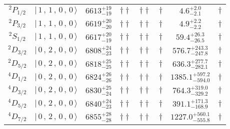 \begin{tabular}{c| c c c c c c c}
$^{2}P_{1/2}$ & $\vert \,1\,,\,1\,,\,0\,,\,0 \,\rangle $ & $6613^{+19}_{-19}$ & $\dagger\dagger$ & $\dagger\dagger$ & $\dagger$ & $4.6^{+2.0}_{-2.1}$ & $\dagger$ \\ 
$^{2}P_{3/2}$ & $\vert \,1\,,\,1\,,\,0\,,\,0 \,\rangle $ & $6619^{+20}_{-20}$ & $\dagger\dagger$ & $\dagger\dagger$ & $\dagger$ & $4.9^{+2.2}_{-2.2}$ & $\dagger$ \\ 
$^{2}S_{1/2}$ & $\vert \,1\,,\,1\,,\,0\,,\,0 \,\rangle $ & $6617^{+20}_{-19}$ & $\dagger\dagger$ & $\dagger\dagger$ & $\dagger$ & $59.4^{+26.3}_{-26.5}$ & $\dagger$ \\ 
$^{2}D_{3/2}$ & $\vert \,0\,,\,2\,,\,0\,,\,0 \,\rangle $ & $6808^{+24}_{-23}$ & $\dagger\dagger$ & $\dagger\dagger$ & $\dagger$ & $576.7^{+243.3}_{-247.8}$ & $\dagger$ \\ 
$^{2}D_{5/2}$ & $\vert \,0\,,\,2\,,\,0\,,\,0 \,\rangle $ & $6818^{+25}_{-25}$ & $\dagger\dagger$ & $\dagger\dagger$ & $\dagger$ & $636.3^{+277.7}_{-282.1}$ & $\dagger$ \\ 
$^{4}D_{1/2}$ & $\vert \,0\,,\,2\,,\,0\,,\,0 \,\rangle $ & $6824^{+26}_{-26}$ & $\dagger\dagger$ & $\dagger\dagger$ & $\dagger$ & $1385.1^{+597.2}_{-594.0}$ & $\dagger$ \\ 
$^{4}D_{3/2}$ & $\vert \,0\,,\,2\,,\,0\,,\,0 \,\rangle $ & $6830^{+25}_{-24}$ & $\dagger\dagger$ & $\dagger\dagger$ & $\dagger$ & $764.3^{+319.0}_{-329.2}$ & $\dagger$ \\ 
$^{4}D_{5/2}$ & $\vert \,0\,,\,2\,,\,0\,,\,0 \,\rangle $ & $6840^{+24}_{-23}$ & $\dagger\dagger$ & $\dagger\dagger$ & $\dagger$ & $391.1^{+171.3}_{-168.9}$ & $\dagger$ \\ 
$^{4}D_{7/2}$ & $\vert \,0\,,\,2\,,\,0\,,\,0 \,\rangle $ & $6855^{+28}_{-28}$ & $\dagger\dagger$ & $\dagger\dagger$ & $\dagger$ & $1227.0^{+560.1}_{-555.8}$ & $\dagger$ \\ 
\hline \hline
\end{tabular}

